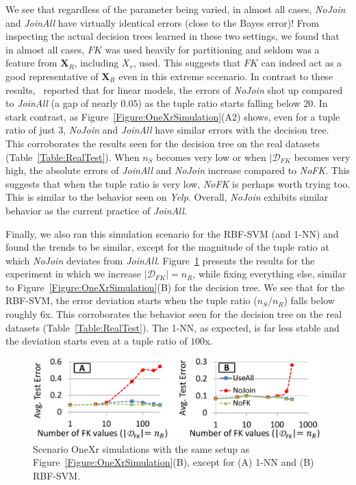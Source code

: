 \documentclass[sigconf]{acmart}
\begin{document}
We see that regardless of the parameter being varied, in almost all cases, \textit{NoJoin} and \textit{JoinAll} have virtually identical errors (close to the Bayes 
error)! From inspecting the actual decision trees learned in these two settings, we found that in almost all cases, $FK$ was used heavily for partitioning and seldom was 
a feature from $\textbf{X}_R$, including $X_r$, used. This suggests that $FK$ can indeed act as a good representative of $\textbf{X}_R$ even in this extreme sccenario. 
In contrast to these results,~\cite{hamlet} reported that for linear models, the errors of \textit{NoJoin} shot up compared to \textit{JoinAll} (a gap of nearly $0.05$)
as the tuple ratio starts falling below $20$. In stark contrast, as Figure~\ref{Figure:OneXrSimulation}(A2) shows, even for a tuple ratio of just $3$, \textit{NoJoin} 
and \textit{JoinAll} have similar errors with the decision tree. This corroborates the results seen for the decision tree on the real datasets (Table~\ref{Table:RealTest}).
When $n_S$ becomes very low or when $|\mathcal{D}_{FK}$ becomes very high, the absolute errors of \textit{JoinAll} and \textit{NoJoin} increase compared to \textit{NoFK}. 
This suggests that when the tuple ratio is very low, \textit{NoFK} is perhaps worth trying too. This is similar to the behavior seen on \textit{Yelp}. 
Overall, \textit{NoJoin} exhibits similar behavior as the current practice of \textit{JoinAll}.

Finally, we also ran this simulation scenario for the RBF-SVM (and 1-NN) and found the trends to be similar, except for the magnitude of the tuple ratio at which 
\textit{NoJoin} deviates from \textit{JoinAll}. Figure~\ref{Figure:OneXr1nnSVMSimulation} presents the results for the experiment in which we increase $|\mathcal{D}_{FK}|=n_R$, 
while fixing everything else, similar to Figure~\ref{Figure:OneXrSimulation}(B) for the decision tree. We see that for the RBF-SVM, the error deviation starts when the 
tuple ratio ($n_S/n_R$) falls below roughly $6$x. This corroborates the behavior seen for the decision tree on the real datasets (Table~\ref{Table:RealTest}).
The 1-NN, as expected, is far less stable and the deviation starts even at a tuple ratio of $100$x.


\begin{figure}[t]
\centering
\includegraphics[width=0.99\linewidth]{onexr_svm_1nn.pdf}
\vspace{-3mm}
\caption{Scenario OneXr simulations with the same setup as Figure~\ref{Figure:OneXrSimulation}(B), except for (A) 1-NN and (B) RBF-SVM.}
\label{Figure:OneXr1nnSVMSimulation}
\vspace{-3mm}
\end{figure}
\end{document}
